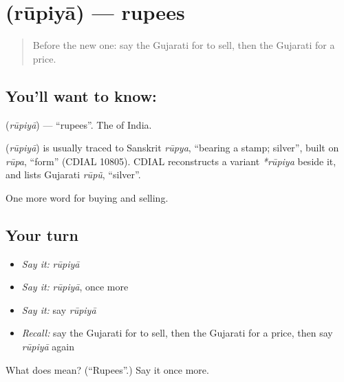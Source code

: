 \section[\texorpdfstring{\gu{રૂપિયા} (rūpiyā)}{રૂપિયા (rūpiyā)}]{ (rūpiyā) — rupees}

\label{lesson:GU-C57-rupees}



\begin{quote}
Before the new one: say the Gujarati for to sell, then the Gujarati for a price.
\end{quote}

\subsection*{You'll want to know: }
\textbf{} (\emph{rūpiyā}) — \textquotedblleft{}rupees\textquotedblright{}. The \textbf{} of India.

\begin{cousinweb}
\textbf{} (\emph{rūpiyā}) is usually traced to Sanskrit \emph{rūpya}, \textquotedblleft{}bearing a stamp; silver\textquotedblright{}, built on \emph{rūpa}, \textquotedblleft{}form\textquotedblright{} (CDIAL 10805). CDIAL reconstructs a variant \emph{*rūpiya} beside it, and lists Gujarati \emph{rūpũ}, \textquotedblleft{}silver\textquotedblright{}.
\end{cousinweb}

\begin{grammarlens}[title={What you've built}]
One more word for buying and selling.
\end{grammarlens}

\subsection*{Your turn}
\begin{itemize}
\raggedright
  \item \emph{Say it:} \emph{rūpiyā}
  \item \emph{Say it:} \emph{rūpiyā}, once more
  \item \emph{Say it:} say \emph{rūpiyā}
  \item \emph{Recall:} say the Gujarati for to sell, then the Gujarati for a price, then say \emph{rūpiyā} again
\end{itemize}

\begin{tcolorbox}[breakable,colback=teal!4,colframe=teal!35!black,title={Before you move on}]
What does  mean? (\textquotedblleft{}Rupees\textquotedblright{}.) Say it once more.
\end{tcolorbox}
